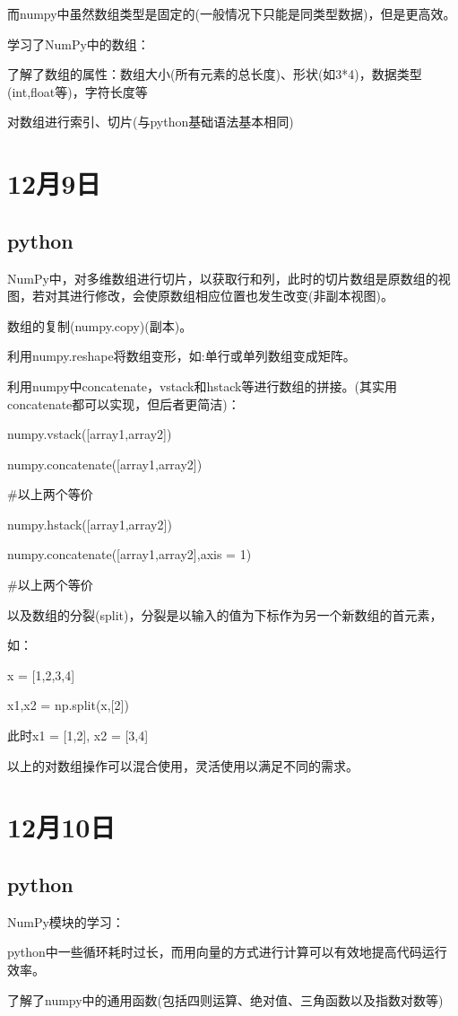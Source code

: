 \documentclass[UTF8]{ctexart}
\begin{document}
而numpy中虽然数组类型是固定的(一般情况下只能是同类型数据)，但是更高效。

学习了NumPy中的数组：

了解了数组的属性：数组大小(所有元素的总长度)、形状(如3*4)，数据类型(int,float等)，字符长度等

对数组进行索引、切片(与python基础语法基本相同)
\section{12月9日}
\subsection{python}
NumPy中，对多维数组进行切片，以获取行和列，此时的切片数组是原数组的视图，若对其进行修改，会使原数组相应位置也发生改变(非副本视图)。

数组的复制(numpy.copy)(副本)。

利用numpy.reshape将数组变形，如:单行或单列数组变成矩阵。

利用numpy中concatenate，vstack和hstack等进行数组的拼接。(其实用concatenate都可以实现，但后者更简洁)：

 numpy.vstack([array1,array2])

 numpy.concatenate([array1,array2])

 \#以上两个等价

 numpy.hstack([array1,array2])

 numpy.concatenate([array1,array2],axis = 1)

 \#以上两个等价

以及数组的分裂(split)，分裂是以输入的值为下标作为另一个新数组的首元素，

如：

 x = [1,2,3,4]

 x1,x2 = np.split(x,[2])

此时x1 = [1,2], x2 = [3,4]

以上的对数组操作可以混合使用，灵活使用以满足不同的需求。
\section{12月10日}
\subsection{python}
NumPy模块的学习：

python中一些循环耗时过长，而用向量的方式进行计算可以有效地提高代码运行效率。

了解了numpy中的通用函数(包括四则运算、绝对值、三角函数以及指数对数等)
\end{document}
